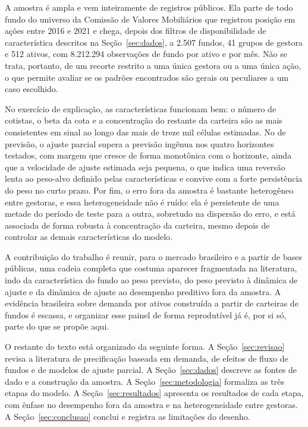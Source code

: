 \documentclass[12pt,a4paper]{article}
\begin{document}
A amostra é ampla e vem inteiramente de registros públicos. Ela parte de todo fundo do
universo da Comissão de Valores Mobiliários que registrou posição em ações entre 2016 e
2021 e chega, depois dos filtros de disponibilidade de característica descritos na
Seção~\ref{sec:dados}, a 2.507 fundos, 41 grupos de gestora e 512 ativos, com 8.212.294
observações de fundo por ativo e por mês. Não se trata, portanto, de um recorte restrito a
uma única gestora ou a uma única ação, o que permite avaliar se os padrões encontrados são
gerais ou peculiares a um caso escolhido.

No exercício de explicação, as características funcionam bem: o número de cotistas, o
beta da cota e a concentração do restante da carteira são as mais consistentes em sinal ao
longo das mais de treze mil células estimadas. No de previsão, o ajuste parcial supera a
previsão ingênua nos quatro horizontes testados, com margem que
cresce de forma monotônica com o horizonte, ainda que a velocidade de ajuste estimada seja
pequena, o que indica uma reversão lenta ao peso-alvo definido pelas características e
convive com a forte persistência do peso no curto prazo. Por fim, o erro fora da amostra é
bastante heterogêneo entre gestoras, e essa heterogeneidade não é ruído: ela é persistente
de uma metade do período de teste para a outra, sobretudo na dispersão do erro, e está
associada de forma robusta à concentração da carteira, mesmo depois de controlar as demais
características do modelo.

A contribuição do trabalho é reunir, para o mercado brasileiro e a partir de bases
públicas, uma cadeia completa que costuma aparecer fragmentada na literatura, indo da
característica do fundo ao peso previsto, do peso previsto à dinâmica de ajuste e da
dinâmica de ajuste ao desempenho preditivo fora da amostra. A evidência brasileira sobre
demanda por ativos construída a partir de carteiras de fundos é escassa, e organizar esse
painel de forma reprodutível já é, por si só, parte do que se propõe aqui.

O restante do texto está organizado da seguinte forma. A Seção~\ref{sec:revisao} revisa a
literatura de precificação baseada em demanda, de efeitos de fluxo de fundos e de modelos
de ajuste parcial. A Seção~\ref{sec:dados} descreve as fontes de dado e a construção da
amostra. A Seção~\ref{sec:metodologia} formaliza as três etapas do modelo. A
Seção~\ref{sec:resultados} apresenta os resultados de cada etapa, com ênfase no desempenho
fora da amostra e na heterogeneidade entre gestoras. A Seção~\ref{sec:conclusao} conclui e
registra as limitações do desenho.
\end{document}
